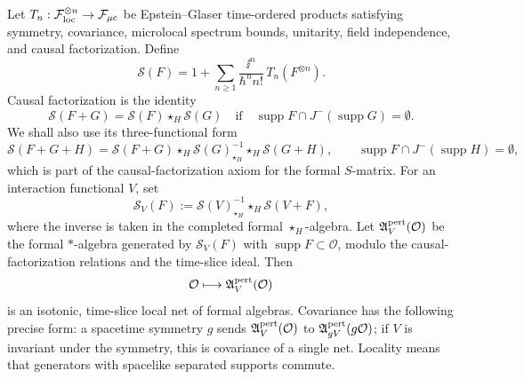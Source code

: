 \begin{proposition}
\label{prop:relative-s-matrices-give-perturbative-local-net}
Let \(T_n:\mathcal F_{\rm loc}^{\otimes n}\to\mathcal F_{\mu{\rm c}}\) be
Epstein--Glaser time-ordered products satisfying symmetry, covariance,
microlocal spectrum bounds, unitarity, field independence, and causal
factorization.  Define
\[
  \mathcal S(F)
  =
  1+\sum_{n\ge1}\frac{\ii^n}{\hbar^n n!}\,T_n(F^{\otimes n}).
\]
Causal factorization is the identity
\begin{equation}
  \mathcal S(F+G)=\mathcal S(F)\star_H\mathcal S(G)
  \quad\text{if}\quad
  \operatorname{supp}F\cap J^-(\operatorname{supp}G)=\emptyset .
  \label{eq:paqft-causal-factorization}
\end{equation}
We shall also use its three-functional form
\begin{equation}
  \mathcal S(F+G+H)
  =
  \mathcal S(F+G)\star_H
  \mathcal S(G)^{-1}_{\star_H}\star_H
  \mathcal S(G+H),
  \qquad
  \operatorname{supp}F\cap J^-(\operatorname{supp}H)=\emptyset ,
  \label{eq:paqft-causal-factorization-three-term}
\end{equation}
which is part of the causal-factorization axiom for the formal \(S\)-matrix.
For an interaction functional \(V\), set
\begin{equation}
  \mathcal S_V(F)
  :=
  \mathcal S(V)^{-1}_{\star_H}\star_H \mathcal S(V+F),
  \label{eq:paqft-relative-s-matrix}
\end{equation}
where the inverse is taken in the completed formal \(\star_H\)-algebra.  Let
\(\mathfrak A_V^{\rm pert}(\mathcal O)\) be the formal \(*\)-algebra
generated by \(\mathcal S_V(F)\) with \(\operatorname{supp}F\subset\mathcal O\),
modulo the causal-factorization relations and the time-slice ideal.  Then
\[
  \mathcal O\longmapsto \mathfrak A_V^{\rm pert}(\mathcal O)
\]
is an isotonic, time-slice local net of formal algebras.  Covariance has the
following precise form: a spacetime symmetry \(g\) sends
\(\mathfrak A_V^{\rm pert}(\mathcal O)\) to
\(\mathfrak A_{gV}^{\rm pert}(g\mathcal O)\); if \(V\) is invariant under the
symmetry, this is covariance of a single net.  Locality means that generators
with spacelike separated supports commute.
\end{proposition}

